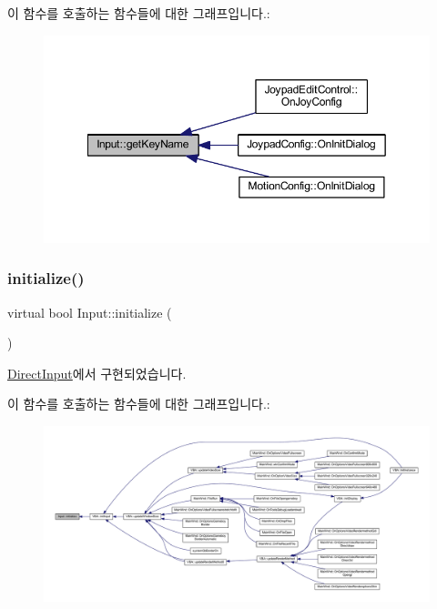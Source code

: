이 함수를 호출하는 함수들에 대한 그래프입니다.\+:
\nopagebreak
\begin{figure}[H]
\begin{center}
\leavevmode
\includegraphics[width=349pt]{class_input_a2c4ec8a744b040657e220480987cd8bf_icgraph}
\end{center}
\end{figure}
\mbox{\label{class_input_affd45f0c278a6ff71b7ae1a567a3dc1c}} 
\subsubsection{\texorpdfstring{initialize()}{initialize()}}
{\footnotesize\ttfamily virtual bool Input\+::initialize (\begin{DoxyParamCaption}{ }\end{DoxyParamCaption})\hspace{0.3cm}{\ttfamily [pure virtual]}}



\mbox{\hyperlink{class_direct_input_a56c3e7924e9d115a2b20b31ee415d544}{Direct\+Input}}에서 구현되었습니다.

이 함수를 호출하는 함수들에 대한 그래프입니다.\+:
\nopagebreak
\begin{figure}[H]
\begin{center}
\leavevmode
\includegraphics[width=350pt]{class_input_affd45f0c278a6ff71b7ae1a567a3dc1c_icgraph}
\end{center}
\end{figure}
\mbox{\label{class_input_a098708c062b906c84ab036c04d447a29}} 
